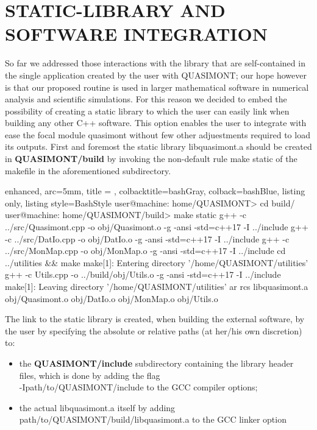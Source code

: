 \documentclass[a4paper, twosided]{book}
\begin{document}
\section[Static-library and software integration]{\changefont STATIC-LIBRARY AND SOFTWARE INTEGRATION}\label{Sec3.3}

\noindent
So far we addressed those interactions with the library that are self-contained in the single application created by the user with QUASIMONT; our hope however is that our proposed routine is used in larger mathematical software in numerical analysis and scientific simulations. For this reason we decided to embed the possibility of creating a static library to which the user can easily link when building any other C++ software. This option enables the user to integrate with ease the focal module \colorbox{poliGrayBlue}{quasimont} without few other adjuestments required to load its outputs. First and foremost the static library \colorbox{poliGrayBlue}{libquasimont.a} should be created in \colorbox{poliGrayBlue}{\textbf{QUASIMONT/build}} by invoking the non-default rule \colorbox{poliGrayBlue}{make static} of the \colorbox{poliGrayBlue}{makefile} in the aforementioned subdirectory.

\vspace{0.5cm}
\begin{tcblisting}{enhanced,
                   arc=5mm,
                   title = \color{black}{\large \ttfamily Creation of libquasimont static library},
                   colbacktitle=bashGray,
                   colback=bashBlue,
                   listing only,
                   listing style=BashStyle}
user@machine: home/QUASIMONT> cd build/
user@machine: home/QUASIMONT/build> make static
g++ -c ../src/Quasimont.cpp -o obj/Quasimont.o -g -ansi -std=c++17 -I ../include 
g++ -c ../src/DatIo.cpp -o obj/DatIo.o -g -ansi -std=c++17 -I ../include 
g++ -c ../src/MonMap.cpp -o obj/MonMap.o -g -ansi -std=c++17 -I ../include 
cd ../utilities && make
make[1]: Entering directory '/home/QUASIMONT/utilities'
g++ -c Utils.cpp -o ../build/obj/Utils.o -g -ansi -std=c++17 -I ../include 
make[1]: Leaving directory '/home/QUASIMONT/utilities'
ar rcs libquasimont.a obj/Quasimont.o obj/DatIo.o obj/MonMap.o obj/Utils.o
\end{tcblisting}
\vspace{0.5cm}

\noindent
The link to the static library is created, when building the external software, by the user by specifying the absolute or relative paths (at her/his own discretion) to:
\begin{itemize}
    \item the \colorbox{poliGrayBlue}{\textbf{QUASIMONT/include}} subdirectory containing the library header files, which is done by adding the flag \\ \colorbox{poliGrayBlue}{-Ipath/to/QUASIMONT/include} to the GCC compiler options;
    \item the actual \colorbox{poliGrayBlue}{libquasimont.a} itself by adding \colorbox{poliGrayBlue}{path/to/QUASIMONT/build/libquasimont.a} to the GCC linker option
\end{itemize}
\end{document}

